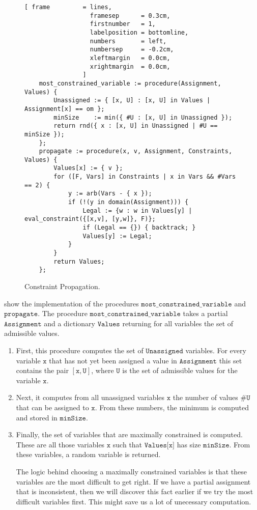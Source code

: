 \begin{figure}[!ht]
\centering
\begin{Verbatim}[ frame         = lines, 
                  framesep      = 0.3cm, 
                  firstnumber   = 1,
                  labelposition = bottomline,
                  numbers       = left,
                  numbersep     = -0.2cm,
                  xleftmargin   = 0.0cm,
                  xrightmargin  = 0.0cm,
                ]
    most_constrained_variable := procedure(Assignment, Values) {
        Unassigned := { [x, U] : [x, U] in Values | Assignment[x] == om };
        minSize    := min({ #U : [x, U] in Unassigned });
        return rnd({ x : [x, U] in Unassigned | #U == minSize });
    };
    propagate := procedure(x, v, Assignment, Constraints, Values) {
        Values[x] := { v };
        for ([F, Vars] in Constraints | x in Vars && #Vars == 2) {
            y := arb(Vars - { x });
            if (!(y in domain(Assignment))) {
                Legal := {w : w in Values[y] | eval_constraint({[x,v], [y,w]}, F)};
                if (Legal == {}) { backtrack; }
                Values[y] := Legal;
            }
        }
        return Values;
    };
\end{Verbatim}
\vspace*{-0.3cm}
\caption{Constraint Propagation.}
\label{fig:csp-constraint-propagation.stlx-2}
\end{figure}
 show the implementation of the procedures $\texttt{most\_constrained\_variable}$
and $\texttt{propagate}$.  The procedure $\texttt{most\_constrained\_variable}$ takes a partial
$\texttt{Assignment}$ and a dictionary $\texttt{Values}$ returning for all variables the set of admissible values.
\begin{enumerate}
\item First, this procedure computes the set of $\texttt{Unassigned}$ variables.  For every variable $\texttt{x}$ that
      has not yet been assigned a value in $\texttt{Assignment}$ this set contains the pair 
      $[\texttt{x}, \texttt{U}]$, where $\texttt{U}$ is the set of admissible values for the variable  $\texttt{x}$.
\item Next, it computes from all unassigned variables $\texttt{x}$ the number of values $\texttt{\#U}$ 
      that can be assigned to $\texttt{x}$.  From these numbers, the minimum is computed and stored in $\texttt{minSize}$.  
\item Finally, the set of variables that are maximally constrained is computed.  These are all those variables
      $\texttt{x}$ such that $\texttt{Values[x]}$ has size $\texttt{minSize}$.  From these variables, a random 
      variable is returned.
      
      The logic behind choosing a maximally constrained variables is that these variables are the most
      difficult to get right.  If we have a partial assignment that is inconsistent, then we will discover this
      fact earlier if we try the most difficult variables first.  This might save us a lot of unecessary
      computation. 
\end{enumerate}
